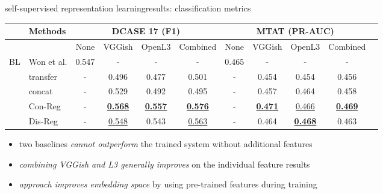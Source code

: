 \begin{frame}{self-supervised representation learning}{results: classification metrics}
    \vspace{-3mm}
    \begin{footnotesize}
    \begin{table}[]
        \centering
        \begin{tabular}{l l | c c c c | c c c c c}
           & Methods & \multicolumn{4}{c}{DCASE 17 (F1)} & \multicolumn{4}{c}{MTAT (PR-AUC)}\\
           \hline
           
           & & None & VGGish & OpenL3 & Combined & None & VGGish & OpenL3 & Combined \\
           \hline
           
           \multirow{4}{*}{BL} & Won et al.  &  0.547 & - & - & - & 0.465 & - & - & - \\
           
           & transfer & - & 0.496	& 0.477	& 0.501 & - & 0.454 & 0.454	& 0.456 \\
           
           & concat & - & 0.529 & 0.492 & 0.495 & - & 0.457 & 0.464 &	0.458\\
           
           \hline
           
           \multirow{2}{*}{Prop.} & Con-Reg  & - & \underline{\textbf{0.568}} & \underline{\textbf{0.557}} & \underline{\textbf{0.576}} & - & \underline{\textbf{0.471}} & \underline{0.466} & \underline{\textbf{0.469}} \\
           
           & Dis-Reg & - & \underline{0.548} & 0.543 & \underline{0.563} & - & 0.464 & \underline{\textbf{0.468}} & 0.463 \\
          
        \end{tabular}
    \end{table}
    \end{footnotesize}
    
    \bigskip
    \begin{itemize}
        \item   two baselines \textit{cannot outperform} the trained system without additional features
        \smallskip
        \item   \textit{combining VGGish and L3 generally improves} on the individual feature results
        \smallskip
        \item   \textit{approach improves embedding space} by using pre-trained features during training
    \end{itemize}
\end{frame}

